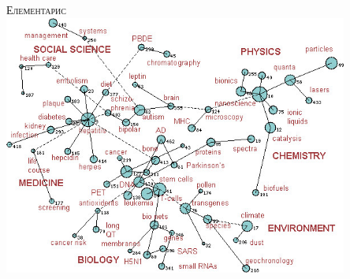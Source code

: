 \begin{titlepage}
\begin{center}

\textsc{\Huge Елементарис}\\[1.5cm]
\includegraphics[width=0.85\textwidth]{../images/map-of-sciences}~
\\[1cm]

\vfill

\date{}

\end{center}
\end{titlepage}
